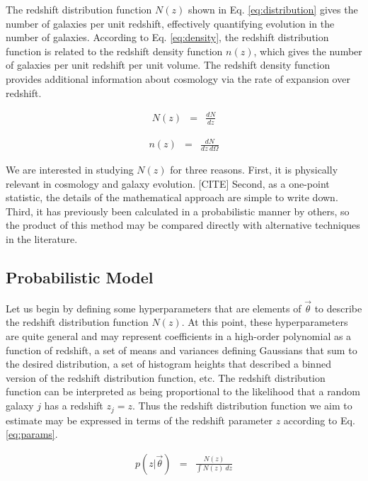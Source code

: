 \documentclass[preprint]{aastex}
\begin{document}
The redshift distribution function $N(z)$ shown in Eq. \ref{eq:distribution} gives the number of galaxies per unit redshift, effectively quantifying evolution in the number of galaxies.  \citep{men13}  According to Eq. \ref{eq:density}, the redshift distribution function is related to the redshift density function $n(z)$, which gives the number of galaxies per unit redshift per unit volume.  The redshift density function provides additional information about cosmology via the rate of expansion over redshift.

\begin{eqnarray}
\label{eq:distribution}
N(z) &=& \frac{dN}{dz}
\end{eqnarray}

\begin{eqnarray}
\label{eq:density}
n(z) &=& \frac{dN}{dz\ d\Omega}
\end{eqnarray}

We are interested in studying $N(z)$ for three reasons.  First, it is physically relevant in cosmology and galaxy evolution.  [CITE]  Second, as a one-point statistic, the details of the mathematical approach are simple to write down.  Third, it has previously been calculated in a probabilistic manner by others, so the product of this method may be compared directly with alternative techniques in the literature.

\subsection{Probabilistic Model}
\label{sec:prob}

Let us begin by defining some hyperparameters that are elements of $\vec{\theta}$ to describe the redshift distribution function $N(z)$.  At this point, these hyperparameters are quite general and may represent coefficients in a high-order polynomial as a function of redshift, a set of means and variances defining Gaussians that sum to the desired distribution, a set of histogram heights that described a binned version of the redshift distribution function, etc.  The redshift distribution function can be interpreted as being proportional to the likelihood that a random galaxy $j$ has a redshift $z_{j}=z$.  Thus the redshift distribution function we aim to estimate may be expressed in terms of the redshift parameter $z$ according to Eq. \ref{eq:params}.

\begin{eqnarray}
\label{eq:params}
p(z|\vec{\theta}) &=& \frac{N(z)}{\int N(z)\ dz}
\end{eqnarray}
\end{document}
